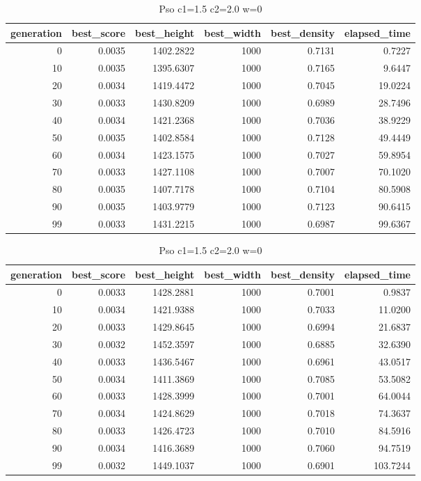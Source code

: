 \begin{table}[htbp]
    \centering
    \caption{Pso c1=1.5 c2=2.0 w=0}
    \label{tab:pso_c1_1_5_c2_2_0_w_0}
    \begin{tabular}{rrrrrr}
    \toprule
    generation & best_score & best_height & best_width & best_density & elapsed_time \\
    \midrule
    0 & 0.0035 & 1402.2822 & 1000 & 0.7131 & 0.7227 \\
    10 & 0.0035 & 1395.6307 & 1000 & 0.7165 & 9.6447 \\
    20 & 0.0034 & 1419.4472 & 1000 & 0.7045 & 19.0224 \\
    30 & 0.0033 & 1430.8209 & 1000 & 0.6989 & 28.7496 \\
    40 & 0.0034 & 1421.2368 & 1000 & 0.7036 & 38.9229 \\
    50 & 0.0035 & 1402.8584 & 1000 & 0.7128 & 49.4449 \\
    60 & 0.0034 & 1423.1575 & 1000 & 0.7027 & 59.8954 \\
    70 & 0.0033 & 1427.1108 & 1000 & 0.7007 & 70.1020 \\
    80 & 0.0035 & 1407.7178 & 1000 & 0.7104 & 80.5908 \\
    90 & 0.0035 & 1403.9779 & 1000 & 0.7123 & 90.6415 \\
    99 & 0.0033 & 1431.2215 & 1000 & 0.6987 & 99.6367 \\
    \bottomrule
    \end{tabular}
\end{table}


\begin{table}[htbp]
    \centering
    \caption{Pso c1=1.5 c2=2.0 w=0}
    \label{tab:pso_c1_1_5_c2_2_0_w_0}
    \begin{tabular}{rrrrrr}
    \toprule
    generation & best_score & best_height & best_width & best_density & elapsed_time \\
    \midrule
    0 & 0.0033 & 1428.2881 & 1000 & 0.7001 & 0.9837 \\
    10 & 0.0034 & 1421.9388 & 1000 & 0.7033 & 11.0200 \\
    20 & 0.0033 & 1429.8645 & 1000 & 0.6994 & 21.6837 \\
    30 & 0.0032 & 1452.3597 & 1000 & 0.6885 & 32.6390 \\
    40 & 0.0033 & 1436.5467 & 1000 & 0.6961 & 43.0517 \\
    50 & 0.0034 & 1411.3869 & 1000 & 0.7085 & 53.5082 \\
    60 & 0.0033 & 1428.3999 & 1000 & 0.7001 & 64.0044 \\
    70 & 0.0034 & 1424.8629 & 1000 & 0.7018 & 74.3637 \\
    80 & 0.0033 & 1426.4723 & 1000 & 0.7010 & 84.5916 \\
    90 & 0.0034 & 1416.3689 & 1000 & 0.7060 & 94.7519 \\
    99 & 0.0032 & 1449.1037 & 1000 & 0.6901 & 103.7244 \\
    \bottomrule
    \end{tabular}
\end{table}


